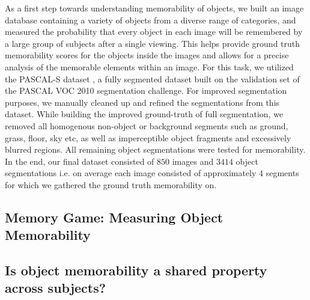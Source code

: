 As a first step towards understanding memorability of objects, we built an image database containing a variety of objects from a diverse range of categories, and measured the probability that every object in each image will be remembered by a large group of subjects after a single viewing. This helps provide ground truth memorability scores for the objects inside the images and allows for a precise analysis of the memorable elements within an image. For this task, we utilized the PASCAL-S dataset \cite{yin14}, a fully segmented dataset built on the validation set of the PASCAL VOC 2010 \cite{pascal10} segmentation challenge. For improved segmentation purposes, we manually cleaned up and refined the segmentations from this dataset. While building the improved ground-truth of full segmentation, we removed all homogenous non-object or background segments such as ground, grass, floor, sky etc, as well as imperceptible object fragments and excessively blurred regions. All remaining object segmentations were tested for memorability. In the end, our final dataset consisted of $850$ images and $3414$ object segmentations i.e. on average each image consisted of approximately $4$ segments for which we gathered the ground truth memorability on.

\subsection{Memory Game: Measuring Object Memorability}


\subsection{Is object memorability a shared property across subjects?}